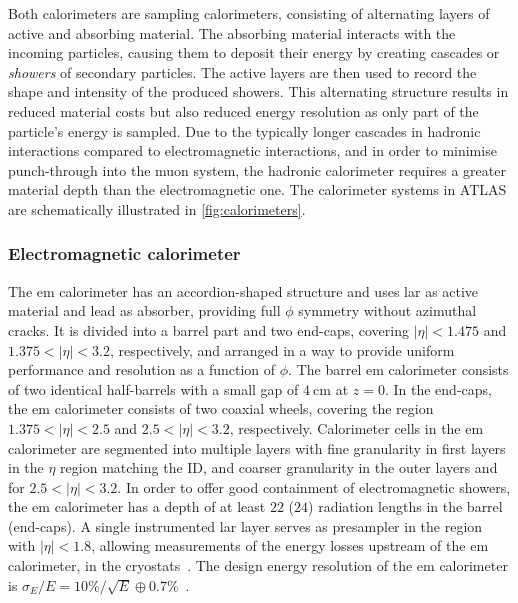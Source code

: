 Both calorimeters are sampling calorimeters, consisting of alternating layers of active and absorbing material. The absorbing material interacts with the incoming particles, causing them to deposit their energy by creating cascades or \textit{showers} of secondary particles. The active layers are then used to record the shape and intensity of the produced showers. This alternating structure results in reduced material costs but also reduced energy resolution as only part of the particle's energy is sampled. Due to the typically longer cascades in hadronic interactions compared to electromagnetic interactions, and in order to minimise punch-through into the muon system, the hadronic calorimeter requires a greater material depth than the electromagnetic one. The calorimeter systems in ATLAS are schematically illustrated in \cref{fig:calorimeters}.

\subsubsection{Electromagnetic calorimeter}

The \gls{em} calorimeter has an accordion-shaped structure and uses \gls{lar} as active material and lead as absorber, providing full $\phi$ symmetry without azimuthal cracks. It is divided into a barrel part and two end-caps, covering $\vert\eta\vert <1.475$ and $1.375 < \vert\eta\vert <3.2$, respectively, and arranged in a way to provide uniform performance and resolution as a function of $\phi$. The barrel \gls{em} calorimeter consists of two identical half-barrels with a small gap of $\SI{4}{\centi\meter}$ at $z=0$. In the end-caps, the \gls{em} calorimeter consists of two coaxial wheels, covering the region $1.375 < \vert\eta\vert <2.5$ and $2.5 < \vert\eta\vert <3.2$, respectively. Calorimeter cells in the \gls{em} calorimeter are segmented into multiple layers with fine granularity in first layers in the $\eta$ region matching the ID, and coarser granularity in the outer layers and for $2.5 < \vert\eta\vert <3.2$. In order to offer good containment of electromagnetic showers, the \gls{em} calorimeter has a depth of at least $22$ ($24$) radiation lengths in the barrel (end-caps). A single instrumented \gls{lar} layer serves as presampler in the region with $\vert\eta\vert <1.8$, allowing measurements of the energy losses upstream of the \gls{em} calorimeter, \eg in the cryostats~\cite{Aad:2008zzm}. The design energy resolution of the \gls{em} calorimeter is $\sigma_E / E = 10\% / \sqrt{E} \oplus 0.7\%$~\cite{Aad:2008zzm}.

